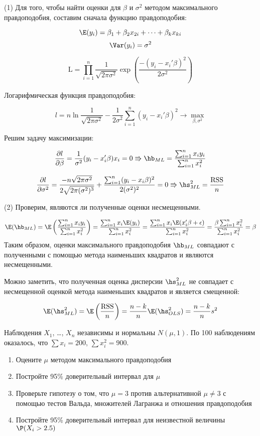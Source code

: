 \documentclass[pdftex,11pt,openany]{book}\usepackage[]{graphicx}\usepackage[]{color}
\begin{document}
\begin{solution}
(1) Для того, чтобы найти оценки для $\beta$ и $\sigma^2$ методом максимального правдоподобия, составим сначала функцию правдоподобия:

\[\E(y_i) = \beta_1 + \beta_2x_{2i}+\dots+\beta_kx_{ki}\]
\[\Var(y_i) = \sigma^2\]

\[\text{L} = \prod_{i=1}^{n} \frac{1}{\sqrt{2\pi \sigma^2}}\exp\left( \frac{-(y_i - x_i'\beta)^2}{2\sigma^2}\right) \]

Логарифмическая функция правдоподобия:

\[l = n \ln \frac{1}{\sqrt{2\pi\sigma^2}} - \frac{1}{2\sigma^2} \sum_{i=1}^{n} (y_i - x_i'\beta)^2 \to \max_{\beta, \sigma^2}\]

Решим задачу максимизации:

\[\frac{\partial l}{\partial\beta} = \frac{1}{\sigma^2}(y_i-x_i'\beta)x_i=0 \Rrightarrow \hb_{ML} = \frac{\sum_{i=1}^{n} x_iy_i}{\sum_{i=1}^{n}x_i^2}\]

\[\frac{\partial l}{\partial\sigma^2} = \frac{-n\sqrt{2\pi\sigma^2}}{2\sqrt{2\pi(\sigma^2)^3}} + \frac{\sum_{i=1}^{n} (y_i - x_i\beta)^2}{2(\sigma^2)^2}=0 \Rrightarrow \hs^2_{ML} = \frac{\text{RSS}}{n}\]

(2) Проверим, являются ли полученные оценки несмещенными.

\[\E(\hb_{ML}) = \E\left( \frac{\sum_{i=1}^{n} x_iy_i}{\sum_{i=1}^{n}x_i^2}\right) = \frac{\sum_{i=1}^{n} x_i\E(y_i)}{\sum_{i=1}^{n}x_i^2} = \frac{\sum_{i=1}^{n} x_i\E(x_i'\beta + \epsilon)}{\sum_{i=1}^{n}x_i^2} = \frac{\beta\sum_{i=1}^{n} x_i^2}{\sum_{i=1}^{n}x_i^2} = \beta\]
Таким образом, оценки максимального правдоподобия $\hb_{ML}$ совпадают с полученными с помощью метода наименьших квадратов и являются несмещенными.

Можно заметить, что полученная оценка дисперсии $\hs^2_{ML}$ не совпадает с несмещенной оценкой метода наименьших квадратов и является смещенной:

\[\E(\hs^2_{ML}) = \E\left( \frac{\text{RSS}}{n}\right) = \frac{n-k}{n}\E(\hs^2_{OLS}) = \frac{n-k}{n}s^2\]

\end{solution}


\begin{problem}
Наблюдения $X_1$, \ldots, $X_n$ независимы и нормальны $N(\mu,1)$. По 100 наблюдениям оказалось, что $\sum x_i=200$, $\sum x_i^2=900$.
\begin{enumerate}
\item Оцените $\mu$ методом максимального правдоподобия
\item Постройте 95\% доверительный интервал для $\mu$
\item Проверьте гипотезу о том, что $\mu=3$ против альтернативной $\mu\neq 3$ с помощью тестов Вальда, множителей Лагранжа и отношения правдоподобия
\item Постройте 95\% доверительный интервал для неизвестной величины $\P(X_i>2.5)$
\end{enumerate}
\end{problem}
\end{document}
